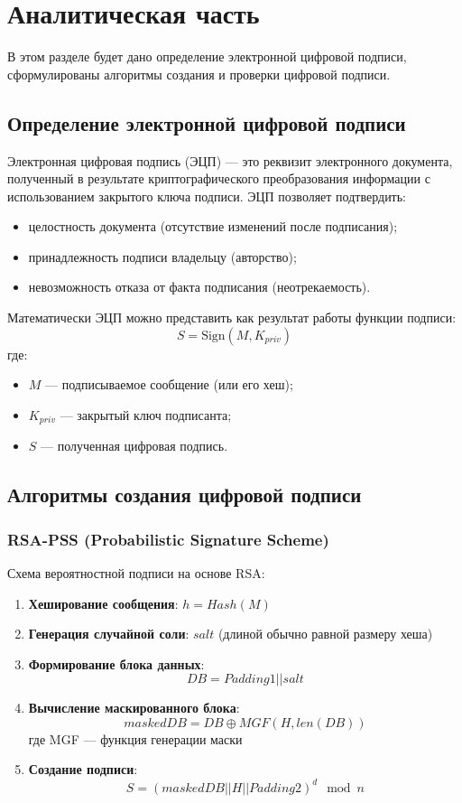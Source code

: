 \chapter{Аналитическая часть}

В этом разделе будет дано определение электронной цифровой подписи, сформулированы алгоритмы создания и проверки цифровой подписи.




\section{Определение электронной цифровой подписи}

Электронная цифровая подпись (ЭЦП) --- это реквизит электронного документа, полученный в результате криптографического преобразования информации с использованием закрытого ключа подписи. ЭЦП позволяет подтвердить:
\begin{itemize}
    \item целостность документа (отсутствие изменений после подписания);
    \item принадлежность подписи владельцу (авторство);
    \item невозможность отказа от факта подписания (неотрекаемость).
\end{itemize}

Математически ЭЦП можно представить как результат работы функции подписи:
$$ S = \text{Sign}(M, K_{priv}) $$
где:
\begin{itemize}
    \item $M$ --- подписываемое сообщение (или его хеш);
    \item $K_{priv}$ --- закрытый ключ подписанта;
    \item $S$ --- полученная цифровая подпись.
\end{itemize}




\section{Алгоритмы создания цифровой подписи}

\subsection*{RSA-PSS (Probabilistic Signature Scheme)}
Схема вероятностной подписи на основе RSA:
\begin{enumerate}
    \item \textbf{Хеширование сообщения}: $h = Hash(M)$
    \item \textbf{Генерация случайной соли}: $salt$ (длиной обычно равной размеру хеша)
    \item \textbf{Формирование блока данных}: 
    $$ DB = Padding1 || salt $$
    \item \textbf{Вычисление маскированного блока}: 
    $$ maskedDB = DB \oplus MGF(H, len(DB)) $$
    где MGF --- функция генерации маски
    \item \textbf{Создание подписи}: 
    $$ S = (maskedDB || H || Padding2)^{d} \mod n $$
\end{enumerate}


